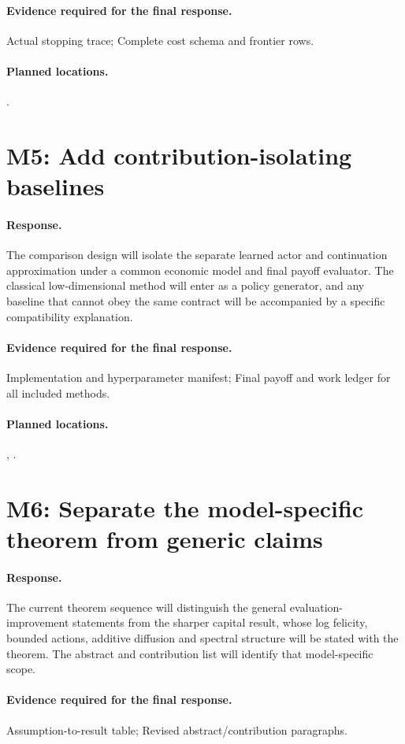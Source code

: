 \paragraph*{Evidence required for the final response.} Actual stopping trace; Complete cost schema and frontier rows.
\paragraph*{Planned locations.} .

\section*{M5: Add contribution-isolating baselines}
\paragraph*{Response.} The comparison design will isolate the separate learned actor and continuation approximation under a common economic model and final payoff evaluator. The classical low-dimensional method will enter as a policy generator, and any baseline that cannot obey the same contract will be accompanied by a specific compatibility explanation.
\paragraph*{Evidence required for the final response.} Implementation and hyperparameter manifest; Final payoff and work ledger for all included methods.
\paragraph*{Planned locations.} , .

\section*{M6: Separate the model-specific theorem from generic claims}
\paragraph*{Response.} The current theorem sequence will distinguish the general evaluation-improvement statements from the sharper capital result, whose log felicity, bounded actions, additive diffusion and spectral structure will be stated with the theorem. The abstract and contribution list will identify that model-specific scope.
\paragraph*{Evidence required for the final response.} Assumption-to-result table; Revised abstract/contribution paragraphs.
